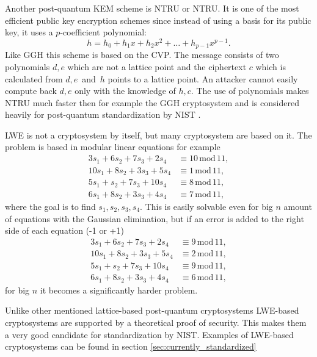 Another post-quantum KEM scheme is NTRU or \acl{NTRU}. It is one of the most efficient public key encryption schemes since instead of using a basis for  its public key, it uses a $p$-coefficient polynomial:
\begin{equation}
  h=h_0+h_1x+h_2x^2+\dots+h_{p-1}x^{p-1}.
\end{equation}
Like GGH this scheme is based on the CVP. The message consists of two polynomials $d, e$ which are not a lattice point and the ciphertext $c$ which is calculated from $d, e$~and~$h$ points to a lattice point. An attacker cannot easily compute back $d, e$ only with the knowledge of $h, c$. The use of polynomials makes NTRU much faster then for example the GGH cryptosystem and is considered heavily for post-quantum standardization by NIST \cite{Bernstein149}.

LWE is not a cryptosystem by itself, but many cryptosystem are based on it. The problem is based in modular linear equations for example
\begin{align}
  3s_1+6s_2+7s_3+2s_4&\equiv 10\,\mathrm{mod}\,11,\\
  10s_1+8s_2+3s_3+5s_4&\equiv 1\,\mathrm{mod}\,11,\\
  5s_1+s_2+7s_3+10s_4&\equiv 8\,\mathrm{mod}\,11,\\
  6s_1+8s_2+3s_3+4s_4&\equiv 7\,\mathrm{mod}\,11,
\end{align}
where the goal is to find $s_1, s_2, s_3, s_4$. This is easily solvable even for big $n$ amount of equations with the Gaussian elimination, but if an error is added to the right side of each equation (-1 or +1)
\begin{align}
  3s_1+6s_2+7s_3+2s_4&\equiv 9\,\mathrm{mod}\,11,\\
  10s_1+8s_2+3s_3+5s_4&\equiv 2\,\mathrm{mod}\,11,\\
  5s_1+s_2+7s_3+10s_4&\equiv 9\,\mathrm{mod}\,11,\\
  6s_1+8s_2+3s_3+4s_4&\equiv 6\,\mathrm{mod}\,11,
\end{align}
for big $n$ it becomes a significantly harder problem. \cite{Regev2005}

Unlike other mentioned lattice-based post-quantum cryptosystems LWE-based cryptosystems are supported by a theoretical proof of security. This makes them a very good candidate for standardization by NIST. Examples of LWE-based cryptosystems can be found in section \ref{sec:currently_standardized}